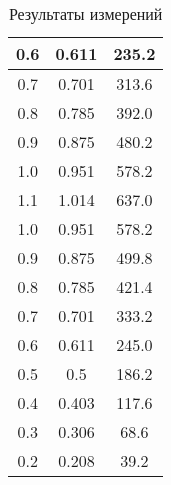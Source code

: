 \documentclass[a4paper,12pt]{article} %
\begin{document}
\begin{table}[h]
\begin{tabular}{|c|c|c|}
            0.6 & 0.611 & 235.2 \\ \hline
            0.7 & 0.701 & 313.6 \\ \hline
            0.8 & 0.785 & 392.0 \\ \hline
            0.9 & 0.875 & 480.2 \\ \hline
            1.0 & 0.951 & 578.2 \\ \hline
            1.1 & 1.014 & 637.0 \\ \hline
            1.0 & 0.951 & 578.2 \\ \hline
            0.9 & 0.875 & 499.8 \\ \hline
            0.8 & 0.785 & 421.4 \\ \hline
            0.7 & 0.701 & 333.2 \\ \hline
            0.6 & 0.611 & 245.0 \\ \hline
            0.5 & 0.5 & 186.2 \\ \hline
            0.4 & 0.403 & 117.6 \\ \hline
            0.3 & 0.306 & 68.6 \\ \hline
            0.2 & 0.208 & 39.2 \\ \hline
	\end{tabular}
        
	\caption{Результаты измерений}
	\label{tab2}
\end{table}
\end{document}
